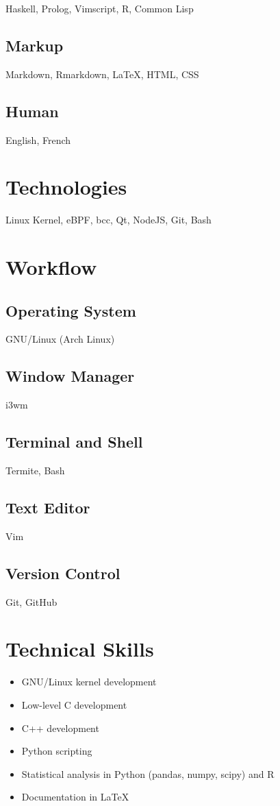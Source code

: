 \documentclass[]{article}
\theoremstyle{plain}
\theoremstyle{remark}
\theoremstyle{definition}
\begin{document}
\begin{figure}
\begin{minipage}[t]{0.32\textwidth}
Haskell, Prolog, Vimscript, R, Common Lisp

\subsection{Markup}

Markdown, Rmarkdown, \LaTeX, HTML, CSS

\subsection{Human}

English, French

\section{Technologies}

Linux Kernel, eBPF, bcc, Qt, NodeJS, Git, Bash

\section{Workflow}

\subsection{Operating System}
GNU/Linux (Arch Linux)

\subsection{Window Manager}
i3wm

\subsection{Terminal and Shell}
Termite, Bash

\subsection{Text Editor}
Vim

\subsection{Version Control}
Git, GitHub

\section{Technical Skills}
\begin{itemize}[itemsep=0em]
\item GNU/Linux kernel development
\item Low-level C development
\item C++ development
\item Python scripting
\item Statistical analysis in Python (pandas, numpy, scipy) and R
\item Documentation in \LaTeX{}
\end{itemize}


\end{minipage}
\end{figure}
\end{document}
